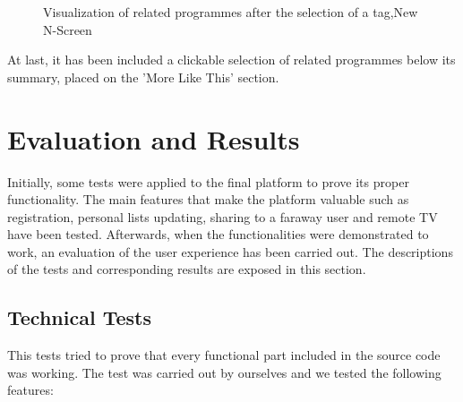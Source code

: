 \documentclass{acm_proc_article-sp}
\begin{document}
\begin{figure}[!htb]
\centering
{}
\caption{Visualization of related programmes after the selection of a tag,New N-Screen}
\label{fig:tagsclick}
\end{figure}

At last, it has been included a clickable selection of related programmes below its summary, placed on the 'More Like This' section. 

\section{Evaluation and Results}
Initially, some tests were applied to the final platform to prove its proper functionality. The main features that make the platform valuable such as
registration, personal lists updating, sharing to a faraway user and remote TV have been tested. Afterwards, when the functionalities were demonstrated to work, an evaluation of the user experience has been carried out. The descriptions of
the tests and corresponding results are exposed in this section.

\subsection{Technical Tests}
This tests tried to prove that every functional part included in the source code was working. The test was carried out by ourselves and we tested the following features:
\end{document}
